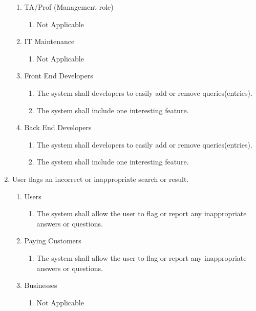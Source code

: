 \documentclass[titlepage]{article}
\begin{document}
\begin{enumerate}[\textbf{{BE}1.}]
\begin{enumerate}[\textbf{{VP5}.1}]
		\item TA/Prof (Management role)
			\begin{enumerate}
				\item Not Applicable
			\end{enumerate}
		
		\item IT Maintenance
			\begin{enumerate}
				\item Not Applicable
			\end{enumerate}
		
		\item Front End Developers
			\begin{enumerate}
				\item The system shall developers to easily add or remove queries(entries).
				\item The system shall include one interesting feature.
			\end{enumerate}
			
		\item Back End Developers
			\begin{enumerate}
				\item The system shall developers to easily add or remove queries(entries).
				\item The system shall include one interesting feature.
			\end{enumerate}
	\end{enumerate}
		
	\item User flags an incorrect or inappropriate search or result.
	\begin{enumerate}[\textbf{{VP6}.1}]
		
		\item Users
			\begin{enumerate}
				\item The system shall allow the user to flag or report any inappropriate answers or questions.
			\end{enumerate}
		
		\item Paying Customers
			\begin{enumerate}
				\item The system shall allow the user to flag or report any inappropriate answers or questions.
			\end{enumerate}
		
		\item Businesses
			\begin{enumerate}
				\item Not Applicable
			\end{enumerate}
		

\end{enumerate}
\end{enumerate}
\end{document}
